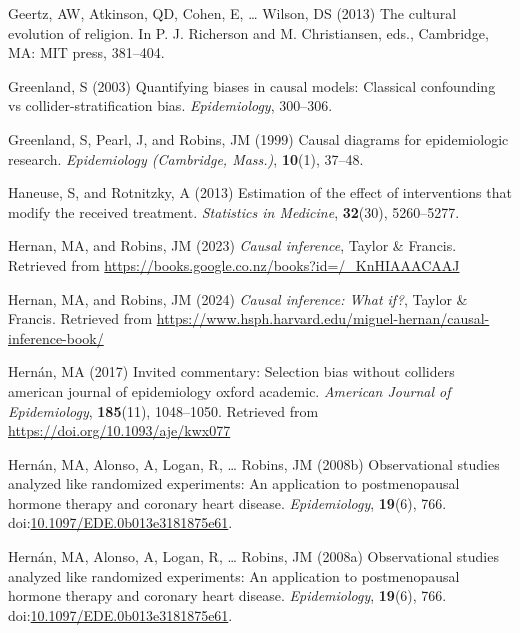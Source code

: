 \documentclass[
  single column]{article}
\newlength{\cslhangindent}
\newenvironment{CSLReferences}[2] %
 {\begin{list}{}{%
  \setlength{\itemindent}{0pt}
  \setlength{\leftmargin}{0pt}
  \setlength{\parsep}{0pt}
  \ifodd #1
   \setlength{\leftmargin}{\cslhangindent}
   \setlength{\itemindent}{-1\cslhangindent}
  \fi
  \setlength{\itemsep}{#2\baselineskip}}}
 {\end{list}}
\begin{document}
\begin{CSLReferences}{1}{0}
Geertz, AW, Atkinson, QD, Cohen, E, \ldots{} Wilson, DS (2013) The
cultural evolution of religion. In P. J. Richerson and M. Christiansen,
eds., Cambridge, MA: MIT press, 381--404.

Greenland, S (2003) Quantifying biases in causal models: Classical
confounding vs collider-stratification bias. \emph{Epidemiology},
300--306.

Greenland, S, Pearl, J, and Robins, JM (1999) Causal diagrams for
epidemiologic research. \emph{Epidemiology (Cambridge, Mass.)},
\textbf{10}(1), 37--48.

Haneuse, S, and Rotnitzky, A (2013) Estimation of the effect of
interventions that modify the received treatment. \emph{Statistics in
Medicine}, \textbf{32}(30), 5260--5277.

Hernan, MA, and Robins, JM (2023) \emph{Causal inference}, Taylor \&
Francis. Retrieved from
\url{https://books.google.co.nz/books?id=/_KnHIAAACAAJ}

Hernan, MA, and Robins, JM (2024) \emph{Causal inference: What if?},
Taylor \& Francis. Retrieved from
\url{https://www.hsph.harvard.edu/miguel-hernan/causal-inference-book/}

Hernán, MA (2017) Invited commentary: Selection bias without colliders
\textbar{} american journal of epidemiology \textbar{} oxford academic.
\emph{American Journal of Epidemiology}, \textbf{185}(11), 1048--1050.
Retrieved from \url{https://doi.org/10.1093/aje/kwx077}

Hernán, MA, Alonso, A, Logan, R, \ldots{} Robins, JM (2008b)
Observational studies analyzed like randomized experiments: An
application to postmenopausal hormone therapy and coronary heart
disease. \emph{Epidemiology}, \textbf{19}(6), 766.
doi:\href{https://doi.org/10.1097/EDE.0b013e3181875e61}{10.1097/EDE.0b013e3181875e61}.

Hernán, MA, Alonso, A, Logan, R, \ldots{} Robins, JM (2008a)
Observational studies analyzed like randomized experiments: An
application to postmenopausal hormone therapy and coronary heart
disease. \emph{Epidemiology}, \textbf{19}(6), 766.
doi:\href{https://doi.org/10.1097/EDE.0b013e3181875e61}{10.1097/EDE.0b013e3181875e61}.


\end{CSLReferences}
\end{document}
